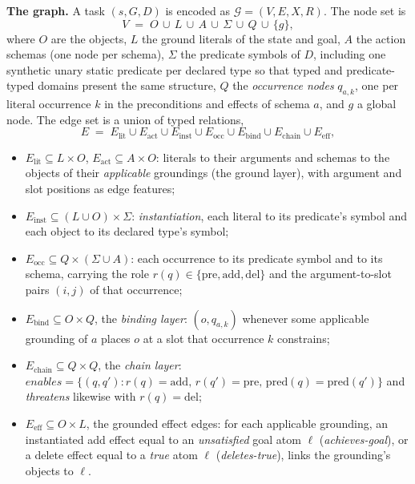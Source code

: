 \documentclass[letterpaper]{article} %
\begin{document}
\textbf{The graph.} A task $(s, G, D)$ is encoded as
$\mathcal{G} = (V, E, X, R)$. The node set is
\begin{equation*}
V \;=\; O \,\cup\, L \,\cup\, A \,\cup\, \Sigma \,\cup\, Q \,\cup\, \{g\},
\end{equation*}
where $O$ are the objects, $L$ the ground literals of the state and goal,
$A$ the action schemas (one node per schema), $\Sigma$ the
predicate symbols of $D$, including one synthetic unary static predicate
per declared type so that typed and predicate-typed domains present the
same structure, $Q$ the \emph{occurrence nodes} $q_{a,k}$, one per
literal occurrence $k$ in the preconditions and effects of schema $a$, and
$g$ a global node. The edge set is a union of typed relations,
\begin{equation*}
E \;=\; E_{\mathrm{lit}} \cup E_{\mathrm{act}} \cup E_{\mathrm{inst}} \cup
E_{\mathrm{occ}} \cup E_{\mathrm{bind}} \cup E_{\mathrm{chain}} \cup
E_{\mathrm{eff}},
\end{equation*}
\begin{itemize}
\item $E_{\mathrm{lit}} \subseteq L \times O$, $E_{\mathrm{act}} \subseteq
  A \times O$: literals to their arguments and schemas to the objects of
  their \emph{applicable} groundings (the ground layer), with argument
  and slot positions as edge features;
\item $E_{\mathrm{inst}} \subseteq (L \cup O) \times \Sigma$:
  \emph{instantiation}, each literal to its predicate's symbol and each
  object to its declared type's symbol;
\item $E_{\mathrm{occ}} \subseteq Q \times (\Sigma \cup A)$: each occurrence
  to its predicate symbol and to its schema, carrying the role
  $r(q) \in \{\mathrm{pre}, \mathrm{add}, \mathrm{del}\}$ and the
  argument-to-slot pairs $(i, j)$ of that occurrence;
\item $E_{\mathrm{bind}} \subseteq O \times Q$, the \emph{binding layer}:
  $(o, q_{a,k})$ whenever some applicable grounding of $a$ places $o$ at a
  slot that occurrence $k$ constrains;
\item $E_{\mathrm{chain}} \subseteq Q \times Q$, the \emph{chain layer}:
  $\textit{enables} = \{(q, q') : r(q) = \mathrm{add},\, r(q') =
  \mathrm{pre},\, \mathrm{pred}(q) = \mathrm{pred}(q')\}$ and
  \textit{threatens} likewise with $r(q) = \mathrm{del}$;
\item $E_{\mathrm{eff}} \subseteq O \times L$, the grounded effect edges: for
  each applicable grounding, an instantiated add effect equal to an
  \emph{unsatisfied} goal atom $\ell$ (\textit{achieves-goal}), or a delete
  effect equal to a \emph{true} atom $\ell$ (\textit{deletes-true}), links
  the grounding's objects to $\ell$.
\end{itemize}
\end{document}
